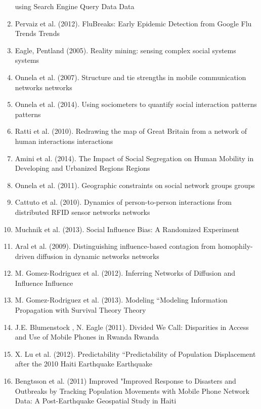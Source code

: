 \begin{enumerate}
using Search Engine Query Data\cite{Ginsberg_2008} Data  \item Pervaiz et al. (2012).  FluBreaks: Early Epidemic Detection from Google Flu Trends\cite{Pervaiz_2012} Trends  \item Eagle, Pentland (2005).  Reality mining: sensing complex social systems\cite{Eagle_2005} systems  
\item Onnela et al. (2007).  Structure and tie strengths in mobile communication networks\cite{Onnela_2007} networks  
\item Onnela et al. (2014).  Using sociometers to quantify social interaction patterns\cite{Onnela_2014} patterns  
\item Ratti et al. (2010).  Redrawing the map of Great Britain from a network of human interactions\cite{Ratti_2010} interactions  \item Amini et al. (2014).  The Impact of Social Segregation on Human Mobility in Developing and Urbanized Regions\cite{Amini_2014} Regions  
\item Onnela et al. (2011).  Geographic constraints on social network groups\cite{Onnela_2011} groups  
\item Cattuto et al. (2010).  Dynamics of person-to-person interactions from distributed RFID sensor networks\cite{Cattuto_2010} networks  
\item Muchnik et al. (2013).  Social Influence Bias: A Randomized Experiment\cite{Muchnik_2013}  
\item Aral et al. (2009).  Distinguishing influence-based contagion from homophily-driven diffusion in dynamic networks\cite{Aral_2009} networks  
\item M. Gomez-Rodriguez et al. (2012).  Inferring Networks of Diffusion and Influence\cite{Gomez_Rodriguez_2012} Influence  
\item  M. Gomez-Rodriguez et al. (2013). Modeling “Modeling  Information Propagation with Survival Theory\cite{rodriguez2013modeling} Theory  
\item J.E. Blumenstock , N. Eagle (2011).  Divided We Call: Disparities in Access and Use of Mobile Phones in Rwanda\cite{blumenstock2012divided} Rwanda  
\item  X. Lu et al. (2012). Predictability “Predictability  of Population Displacement after the 2010 Haiti Earthquake\cite{Lu_2012} Earthquake  
\item  Bengtsson et al. (2011) Improved "Improved  Response to Disasters and Outbreaks by Tracking Population Movements with Mobile Phone Network Data: A Post-Earthquake Geospatial Study in Haiti\cite{Bengtsson_2011}  

\end{enumerate}
